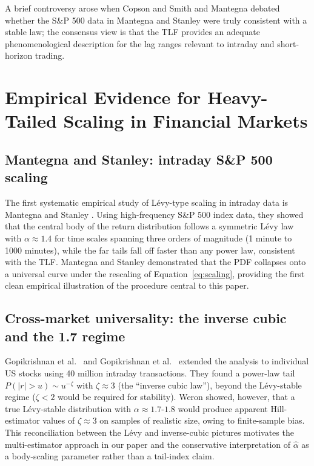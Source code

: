 \documentclass[12pt,a4paper]{article}
\begin{document}
A brief controversy arose when Copson and Smith \cite{CopsonSmith1995} and
Mantegna \cite{Mantegna1995reply} debated whether the S\&P 500 data in
Mantegna and Stanley \cite{MantegnaStanley1995} were truly consistent with a stable law;
the consensus view \cite{BouchaudPotters2003} is that the TLF
provides an adequate phenomenological description for the lag ranges relevant to
intraday and short-horizon trading.


\section{Empirical Evidence for Heavy-Tailed Scaling in Financial Markets}
\label{sec:empirical}

\subsection{Mantegna and Stanley: intraday S\&P 500 scaling}

The first systematic empirical study of Lévy-type scaling in intraday data is
Mantegna and Stanley \cite{MantegnaStanley1994,MantegnaStanley1995}. Using high-frequency
S\&P 500 index data, they showed that the central body of the return
distribution follows a symmetric Lévy law with $\alpha \approx 1.4$ for time
scales spanning three orders of magnitude (1 minute to 1000 minutes), while the
far tails fall off faster than any power law, consistent with the TLF.
Mantegna and Stanley \cite{MantegnaStanley1995} demonstrated that the PDF collapses onto a
universal curve under the rescaling of Equation~\eqref{eq:scaling}, providing
the first clean empirical illustration of the procedure central to this paper.

\subsection{Cross-market universality: the inverse cubic and the 1.7 regime}

Gopikrishnan et al.\ \cite{Gopikrishnan1998} and Gopikrishnan et al.\ \cite{Gopikrishnan1999} extended the
analysis to individual US stocks using 40 million intraday transactions. They
found a power-law tail $P(|r| > u) \sim u^{-\zeta}$ with $\zeta \approx 3$
(the ``inverse cubic law''), beyond the Lévy-stable regime ($\zeta < 2$ would
be required for stability). Weron \cite{Weron2001} showed, however, that a
true Lévy-stable distribution with $\alpha \approx 1.7$-$1.8$ would produce
apparent Hill-estimator values of $\zeta \approx 3$ on samples of realistic
size, owing to finite-sample bias. This reconciliation between the Lévy and
inverse-cubic pictures motivates the multi-estimator approach in our paper and
the conservative interpretation of $\hat\alpha$ as a body-scaling parameter
rather than a tail-index claim.
\end{document}

